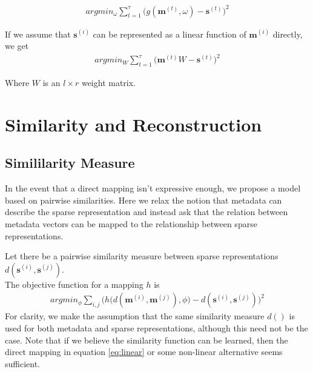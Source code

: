 \documentclass{article} %
\newcommand{\Mt}[1]{\textbf{m}^{(#1)}}
\newcommand{\st}[1]{\textbf{s}^{(#1)}}
\newcommand{\pairsim}[1]{d(#1)}
\newcommand{\learned}[1]{h\Big( \pairsim{#1},\phi \Big)} %
\begin{document}
\begin{gather} 
	argmin_{\omega} \sum_{t=1}^{\tau} \big( g(\Mt{t}, \omega) - \st{t}  \big)^2 
\end{gather}

If we assume that $\st{i}$ can be represented as a linear function of $\Mt{i}$ directly, we get
\begin{gather} \label{eq:linear}
	argmin_{W} \sum_{t=1}^{\tau} \big( \Mt{t}W - \st{t}  \big)^2 
\end{gather}

Where $W$ is an $l \times r$ weight matrix.


\section{Similarity and Reconstruction}

\subsection{Simililarity Measure}
In the event that a direct mapping isn't expressive enough, we propose a model based on pairwise similarities. Here we relax the notion that metadata can describe the sparse representation and instead ask that the relation between metadata vectors can be mapped to the relationship between sparse representations.

Let there be a pairwise similarity measure between sparse representations $\pairsim{\st{i},\st{j}}$. \\
The objective function for a mapping $h$ is 
%	
%
\begin{eqnarray}
	  argmin_{\phi} \sum_{i,j} \bigg( \learned{\Mt{i},\Mt{j}} - \pairsim{\st{i},\st{j} } \bigg)^2 
\end{eqnarray}
For clarity, we make the assumption that the same similarity measure $\pairsim{}$ is used for both metadata and sparse representations, although this need not be the case. Note that if we believe the similarity function can be learned, then the direct mapping in equation \ref{eq:linear} or some non-linear alternative seems sufficient.
\end{document}
